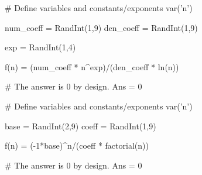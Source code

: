 \begin{sagesilent}
# Define variables and constants/exponents
var('n')

num_coeff = RandInt(1,9)
den_coeff = RandInt(1,9)

exp = RandInt(1,4)

f(n) = (num_coeff * n^exp)/(den_coeff * ln(n))

# The answer is 0 by design.
Ans = 0

\end{sagesilent}

\begin{sagesilent}
# Define variables and constants/exponents
var('n')

base = RandInt(2,9)
coeff = RandInt(1,9)

f(n) = (-1*base)^n/(coeff * factorial(n))

# The answer is 0 by design.
Ans = 0

\end{sagesilent}






